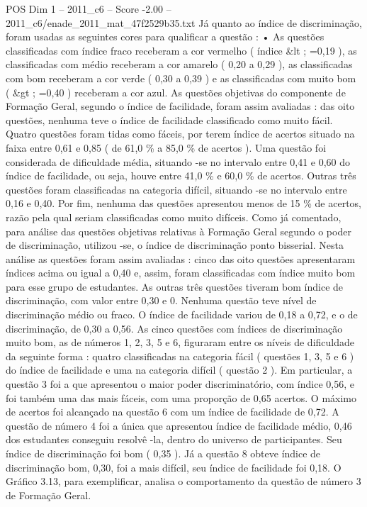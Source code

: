 \begin{textsample}{POS Dim 1 – 2011\_c6 – Score -2.00 – 2011\_c6/enade\_2011\_mat\_47f2529b35.txt}
Já quanto ao índice de discriminação, foram usadas as seguintes cores para qualificar a questão : • As questões classificadas com índice fraco receberam a cor vermelho ( índice \&lt ; =0,19 ), as classificadas com médio receberam a cor amarelo ( 0,20 a 0,29 ), as classificadas com bom receberam a cor verde ( 0,30 a 0,39 ) e as classificadas com muito bom ( \&gt ; =0,40 ) receberam a cor azul.
As questões objetivas do componente de Formação Geral, segundo o índice de facilidade, foram assim avaliadas : das oito questões, nenhuma teve o índice de facilidade classificado como muito fácil.
Quatro questões foram tidas como fáceis, por terem índice de acertos situado na faixa entre 0,61 e 0,85 ( de 61,0 \% a 85,0 \% de acertos ).
Uma questão foi considerada de dificuldade média, situando -se no intervalo entre 0,41 e 0,60 do índice de facilidade, ou seja, houve entre 41,0 \% e 60,0 \% de acertos.
Outras três questões foram classificadas na categoria difícil, situando -se no intervalo entre 0,16 e 0,40.
Por fim, nenhuma das questões apresentou menos de 15 \% de acertos, razão pela qual seriam classificadas como muito difíceis.
Como já comentado, para análise das questões objetivas relativas à Formação Geral segundo o poder de discriminação, utilizou -se, o índice de discriminação ponto bisserial.
Nesta análise as questões foram assim avaliadas : cinco das oito questões apresentaram índices acima ou igual a 0,40 e, assim, foram classificadas com índice muito bom para esse grupo de estudantes.
As outras três questões tiveram bom índice de discriminação, com valor entre 0,30 e 0.
Nenhuma questão teve nível de discriminação médio ou fraco.
O índice de facilidade variou de 0,18 a 0,72, e o de discriminação, de 0,30 a 0,56.
As cinco questões com índices de discriminação muito bom, as de números 1, 2, 3, 5 e 6, figuraram entre os níveis de dificuldade da seguinte forma : quatro classificadas na categoria fácil ( questões 1, 3, 5 e 6 ) do índice de facilidade e uma na categoria difícil ( questão 2 ).
Em particular, a questão 3 foi a que apresentou o maior poder discriminatório, com índice 0,56, e foi também uma das mais fáceis, com uma proporção de 0,65 acertos.
O máximo de acertos foi alcançado na questão 6 com um índice de facilidade de 0,72.
A questão de número 4 foi a única que apresentou índice de facilidade médio, 0,46 dos estudantes conseguiu resolvê -la, dentro do universo de participantes.
Seu índice de discriminação foi bom ( 0,35 ).
Já a questão 8 obteve índice de discriminação bom, 0,30, foi a mais difícil, seu índice de facilidade foi 0,18.
O Gráfico 3.13, para exemplificar, analisa o comportamento da questão de número 3 de Formação Geral.

\end{textsample}
